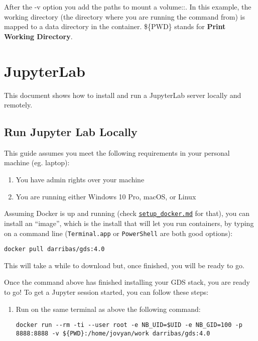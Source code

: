 \documentclass[
]{book}
\providecommand{\tightlist}{%
  \setlength{\itemsep}{0pt}\setlength{\parskip}{0pt}}
\begin{document}
After the -v option you add the paths to mount a volume::. In this example, the working directory (the directory where you are running the command from) is mapped to a data directory in the container. \$\{PWD\} stands for \textbf{Print Working Directory}.

\hypertarget{jupyterlab}{%
\chapter{JupyterLab}\label{jupyterlab}}

This document shows how to install and run a JupyterLab server locally and
remotely.

\hypertarget{run-jupyter-lab-locally}{%
\section{Run Jupyter Lab Locally}\label{run-jupyter-lab-locally}}

This guide assumes you meet the following requirements in your personal
machine (eg. laptop):

\begin{enumerate}
\def\labelenumi{\arabic{enumi}.}
\tightlist
\item
  You have admin rights over your machine
\item
  You are running either Windows 10 Pro, macOS, or Linux
\end{enumerate}

Assuming Docker is up and running (check \href{setup_docker.md}{\texttt{setup\_docker.md}}
for that), you can install an ``image'', which is the install that will let you
run containers, by typing on a command line (\texttt{Terminal.app} or \texttt{PowerShell}
are both good options):

\begin{verbatim}
docker pull darribas/gds:4.0
\end{verbatim}

This will take a while to download but, once finished, you will be ready
to go.

Once the command above has finished installing your GDS stack, you are ready to go! To get a Jupyter session started, you can follow these steps:

\begin{enumerate}
\def\labelenumi{\arabic{enumi}.}
\item
  Run on the same terminal as above the following command:

\begin{verbatim}
docker run --rm -ti --user root -e NB_UID=$UID -e NB_GID=100 -p 8888:8888 -v ${PWD}:/home/jovyan/work darribas/gds:4.0
\end{verbatim}
\end{enumerate}
\end{document}
